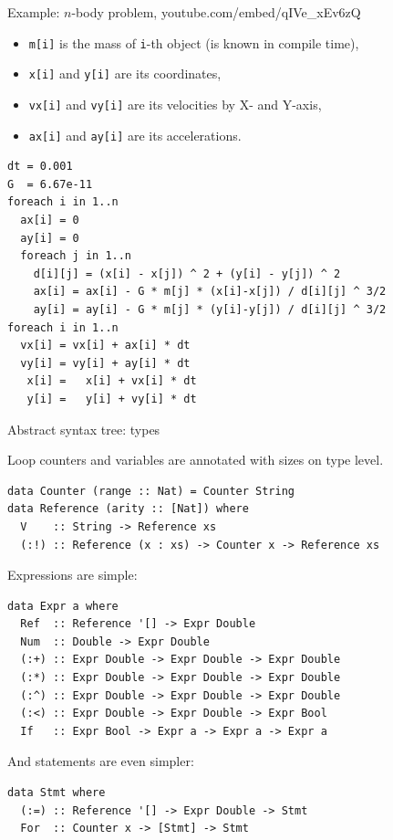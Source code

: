 \documentclass[handout]{beamer}
\begin{document}
\begin{frame}[fragile]{Example: $n$-body problem, {\normalsize youtube.com/embed/qIVe\_xEv6zQ}}

\begin{itemize}
\item {\tt m[i]} is the mass of {\tt i}-th object (is known in compile time),
\item {\tt x[i]} and {\tt y[i]} are its coordinates,
\item {\tt vx[i]} and {\tt vy[i]} are its velocities by X- and Y-axis,
\item {\tt ax[i]} and {\tt ay[i]} are its accelerations.
\end{itemize}

\begin{lstlisting}
dt = 0.001
G  = 6.67e-11
foreach i in 1..n
  ax[i] = 0
  ay[i] = 0
  foreach j in 1..n
    d[i][j] = (x[i] - x[j]) ^ 2 + (y[i] - y[j]) ^ 2
    ax[i] = ax[i] - G * m[j] * (x[i]-x[j]) / d[i][j] ^ 3/2
    ay[i] = ay[i] - G * m[j] * (y[i]-y[j]) / d[i][j] ^ 3/2
foreach i in 1..n
  vx[i] = vx[i] + ax[i] * dt
  vy[i] = vy[i] + ay[i] * dt
   x[i] =   x[i] + vx[i] * dt
   y[i] =   y[i] + vy[i] * dt
\end{lstlisting}

\end{frame}

\begin{frame}[fragile]{Abstract syntax tree: types}

\vspace{-1ex}

Loop counters and variables are annotated with sizes on type level.

\begin{lstlisting}
data Counter (range :: Nat) = Counter String
data Reference (arity :: [Nat]) where
  V    :: String -> Reference xs
  (:!) :: Reference (x : xs) -> Counter x -> Reference xs
\end{lstlisting}

Expressions are simple:

\begin{lstlisting}
data Expr a where
  Ref  :: Reference '[] -> Expr Double
  Num  :: Double -> Expr Double
  (:+) :: Expr Double -> Expr Double -> Expr Double
  (:*) :: Expr Double -> Expr Double -> Expr Double
  (:^) :: Expr Double -> Expr Double -> Expr Double
  (:<) :: Expr Double -> Expr Double -> Expr Bool
  If   :: Expr Bool -> Expr a -> Expr a -> Expr a
\end{lstlisting}

And statements are even simpler:

\begin{lstlisting}
data Stmt where
  (:=) :: Reference '[] -> Expr Double -> Stmt
  For  :: Counter x -> [Stmt] -> Stmt
\end{lstlisting}

\end{frame}
\end{document}
